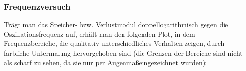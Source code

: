 \documentclass[11pt,a4paper,oneside]{scrartcl}
\begin{document}
\subsubsection{Frequenzversuch}
Trägt man das Speicher- bzw. Verlustmodul doppellogarithmisch gegen die Oszillationsfrequenz auf, erhält man den folgenden Plot, in dem Frequenzbereiche, die qualitativ unterschiedliches Verhalten zeigen, durch farbliche Untermalung hervorgehoben sind (die Grenzen der Bereiche sind nicht als scharf zu sehen, da sie nur \glqq per Augenmaß\Grqq eingezeichnet wurden):

\end{document}
